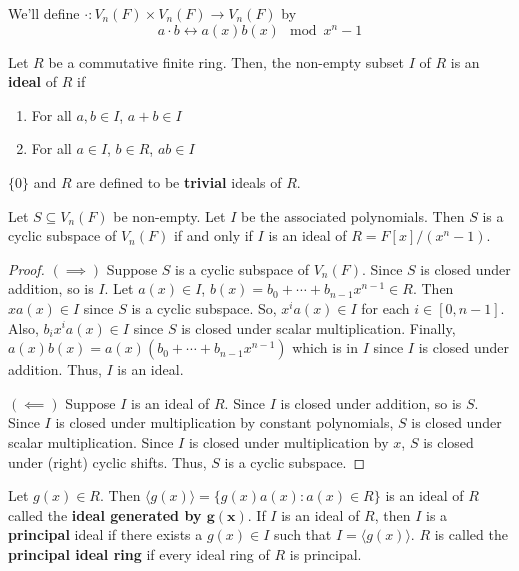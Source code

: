 We'll define $ \cdot : V_n(F)\times V_n(F)\to V_n(F) $
by
\[ a\cdot b \longleftrightarrow a(x)b(x)\mod x^n-1 \]

\begin{defbox}
    \begin{definition}
        Let $ R $ be a commutative finite ring. Then, the non-empty
        subset $ I $ of $ R $ is an \textbf{ideal} of $ R $ if
        \begin{enumerate}[label=(\arabic*)]
            \item For all $ a,b\in I $, $ a+b\in I $
            \item For all $ a\in I $, $ b\in R $, $ ab\in I $
        \end{enumerate}
        $ \{0\} $ and $ R $ are defined to be \textbf{trivial} ideals of $ R $.
    \end{definition}
\end{defbox}

\begin{thmbox}
    \begin{theorem}
        Let $ S\subseteq V_n(F) $ be non-empty. Let $ I $ be the associated polynomials.
        Then $ S $ is a cyclic subspace of $ V_n(F) $ if and only if $ I $
        is an ideal of $ R=F[x]/(x^n-1) $.
    \end{theorem}
\end{thmbox}

\begin{proof}
    $ (\implies) $ Suppose $ S $ is a cyclic subspace of $ V_n(F) $.
    Since $ S $ is closed under addition, so is $ I $.
    Let $ a(x)\in I $, $ b(x)=b_0+\cdots+b_{n-1}x^{n-1}\in R $.
    Then $ xa(x)\in I $ since $ S $ is a cyclic subspace. So,
    $ x^i a(x)\in I $ for each $ i\in [0,n-1] $. Also,
    $ b_i x^i a(x)\in I $ since $ S $ is closed under scalar multiplication.
    Finally, $ a(x)b(x)=a(x)(b_0+\cdots+b_{n-1}x^{n-1}) $ which is in $ I $
    since $ I $ is closed under addition. Thus, $ I $ is an ideal.

    $ (\impliedby) $ Suppose $ I $ is an ideal of $ R $. Since $ I $
    is closed under addition, so is $ S $. Since $ I $ is closed
    under multiplication by constant polynomials, $ S $ is closed
    under scalar multiplication. Since $ I $ is closed under
    multiplication by $ x $, $ S $ is closed under (right) cyclic shifts.
    Thus, $ S $ is a cyclic subspace.
\end{proof}

\begin{defbox}
    \begin{definition}
        Let $ g(x)\in R $. Then $ \langle g(x) \rangle = \{g(x)a(x):a(x)\in R\} $
        is an ideal of $ R $ called the \textbf{ideal generated by $\bm{g(x)}$}.
        If $ I $ is an ideal of $ R $, then $ I $ is a \textbf{principal}
        ideal if there exists a $ g(x)\in I $ such that $ I= \langle g(x) \rangle $.
        $ R $ is called the \textbf{principal ideal ring} if every ideal
        ring of $ R $ is principal.
    \end{definition}
\end{defbox}

